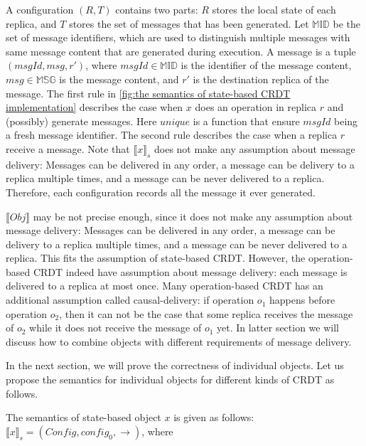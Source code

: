 A configuration $(R,T)$ contains two parts: $R$ stores the local state of each replica, and $T$ stores the set of messages that has been generated. Let $\mathbb{MID}$ be the set of message identifiers, which are used to distinguish multiple messages with same message content that are generated during execution. A message is a tuple $(\mathit{msgId},\mathit{msg},r')$, where $\mathit{msgId} \in \mathbb{MID}$ is the identifier of the message content, $\mathit{msg} \in \mathbb{MSG}$ is the message content, and $r'$ is the destination replica of the message. The first rule in \autoref{fig:the semantics of state-based CRDT implementation} describes the case when $x$ does an operation in replica $r$ and (possibly) generate messages. Here $\mathit{unique}$ is a function that ensure $\mathit{msgId}$ being a fresh message identifier. The second rule describes the case when a replica $r$ receive a message. Note that $\llbracket x \rrbracket_{s}$ does not make any assumption about message delivery: Messages can be delivered in any order, a message can be delivery to a replica multiple times, and a message can be never delivered to a replica. Therefore, each configuration records all the message it ever generated. 









$\llbracket \mathit{Obj} \rrbracket$ may be not precise enough, since it does not make any assumption about message delivery: Messages can be delivered in any order, a message can be delivery to a replica multiple times, and a message can be never delivered to a replica. This fits the assumption of state-based CRDT. However, the operation-based CRDT indeed have assumption about message delivery: each message is delivered to a replica at most once. Many operation-based CRDT has an additional assumption called causal-delivery: if operation $o_1$ happens before operation $o_2$, then it can not be the case that some replica receives the message of $o_2$ while it does not receive the message of $o_1$ yet. In latter section we will discuss how to combine objects with different requirements of message delivery.

In the next section, we will prove the correctness of individual objects. Let us propose the semantics for individual objects for different kinds of CRDT as follows.

The semantics of state-based object $x$ is given as follows: $\llbracket x \rrbracket_{s} = (\mathit{Config},\mathit{config}_0,\rightarrow)$, where

